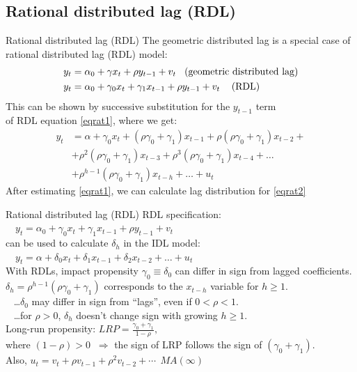 \documentclass{beamer}
\begin{document}
\subsection{Rational distributed lag (RDL)}
\begin{frame}{Rational distributed lag (RDL)}
The geometric distributed lag is a special case of \\rational distributed lag (RDL) model:
\begin{align} \nonumber
y_t & = \alpha_0+\gamma x_t + \rho y_{t-1} + v_t \hspace{0.3cm} \textnormal{(geometric distributed lag)}\\\label{eqrat1} 
y_t & = \alpha_0+\gamma_0 x_t +\gamma_1 x_{t-1} + \rho y_{t-1} + v_t  \hspace{0.3cm} \textnormal{ (RDL)}
\end{align}
This can be shown by successive substitution for the $y_{t-1}$ term \\of RDL equation \eqref{eqrat1}, where we get:
\begin{align}\nonumber
y_t & = \alpha + \gamma_0 x_t + (\rho \gamma_0 + \gamma_1) x_{t-1} + \rho (\rho \gamma_0 + \gamma_1) x_{t-2} +\\ & + \rho^2 (\rho \gamma_0 + \gamma_1) x_{t-3} + \rho^3 (\rho \gamma_0 + \gamma_1) x_{t-4}+ \dots \nonumber \\  &+\rho^{h-1}(\rho \gamma_0 + \gamma_1)x_{t-h} + \dots + u_t \label{eqrat2}
\end{align}
After estimating \eqref{eqrat1}, we can calculate lag distribution for \eqref{eqrat2}
\end{frame}
\begin{frame}{Rational distributed lag (RDL)}
RDL specification:\\
\medskip
$\quad y_t = \alpha_0+\gamma_0 x_t +\gamma_1 x_{t-1} + \rho y_{t-1}  + v_t $\\
\medskip
can be used to calculate $\delta_h$ in the IDL model:\\
\medskip
$\quad y_t = \alpha + \delta_0 x_t  + \delta_1 x_{t-1} + \delta_2 x_{t-2} + \dots + u_t $\\
\medskip
With RDLs, impact propensity $\gamma_0 \equiv \delta_0$ can differ in sign from lagged coefficients. \\
\medskip
$\delta_h = \rho^{h-1}(\rho \gamma_0 + \gamma_1)$ corresponds to the $x_{t-h}$ variable for $h \geq 1$. \\
\smallskip
~ \dots $\delta_0$ may differ in sign from ``lags'', even if $0 < \rho < 1$.\\
~ \dots for $\rho > 0$, $\delta_h$ doesn't change sign with growing $h \geq 1$. \\
\bigskip
Long-run propensity: $\textit{LRP} = \frac{\gamma_0 + \gamma_1}{1-\rho},$\\
\smallskip
where $(1-\rho) > 0$ $\> \Rightarrow$ the sign of LRP follows the sign of $(\gamma_0+\gamma_1)$. \\
\medskip
Also,  $u_t = v_t + \rho v_{t-1} + \rho^2 v_{t-2} + \cdots \> \>  MA(\infty)$
\end{frame}
\end{document}
